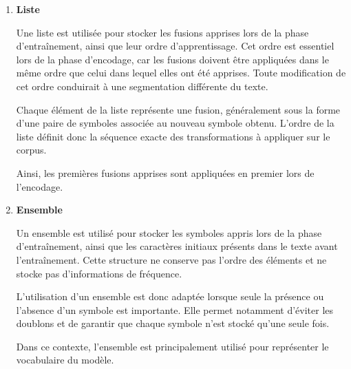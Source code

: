 \documentclass[12pt,a4paper]{report}
\begin{document}
\begin{enumerate}
		Cette structure de données est utilisée pour associer chaque paire de symboles à l’ensemble de ses occurrences dans le corpus. Pour chaque paire, la valeur associée dans le dictionnaire est un ensemble de couples de références vers les deux nœuds consécutifs de la liste doublement chaînée contenant cette paire.
		
		Le principal avantage de cette structure est de permettre un accès direct aux occurrences d’une paire donnée. En utilisant la paire comme clé, il est possible d’obtenir immédiatement l’ensemble des couples de références associés, sans avoir à parcourir l’intégralité du corpus.
		
		Cette structure joue un rôle essentiel lors des opérations de fusion, car elle permet de localiser rapidement les occurrences de la paire à fusionner ainsi que les paires voisines susceptibles d’être affectées par cette fusion. Les mises à jour peuvent ainsi être limitées aux seules parties du corpus concernées, ce qui évite de reparcourir l’ensemble de la liste doublement chaînée à chaque itération de l’algorithme et améliore son efficacité.
		
		\item \textbf{Liste}
		
		Une liste est utilisée pour stocker les fusions apprises lors de la phase d’entraînement, ainsi que leur ordre d’apprentissage. Cet ordre est essentiel lors de la phase d’encodage, car les fusions doivent être appliquées dans le même ordre que celui dans lequel elles ont été apprises. Toute modification de cet ordre conduirait à une segmentation différente du texte.
		
		Chaque élément de la liste représente une fusion, généralement sous la forme d’une paire de symboles associée au nouveau symbole obtenu. L’ordre de la liste définit donc la séquence exacte des transformations à appliquer sur le corpus.
		
		Ainsi, les premières fusions apprises sont appliquées en premier lors de l’encodage.
		
		\item \textbf{Ensemble}
		
		Un ensemble est utilisé pour stocker les symboles appris lors de la phase d’entraînement, ainsi que les caractères initiaux présents dans le texte avant l’entraînement. Cette structure ne conserve pas l’ordre des éléments et ne stocke pas d’informations de fréquence.
		
		L’utilisation d’un ensemble est donc adaptée lorsque seule la présence ou l’absence d’un symbole est importante. Elle permet notamment d’éviter les doublons et de garantir que chaque symbole n’est stocké qu’une seule fois.
		
		Dans ce contexte, l’ensemble est principalement utilisé pour représenter le vocabulaire du modèle.
		
	\end{enumerate}
	
\end{document}
